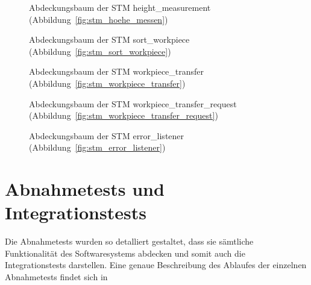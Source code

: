 \begin{figure}
    \caption{Abdeckungsbaum der STM height\_measurement
        (Abbildung~\ref{fig:stm_hoehe_messen})}
    \label{fig:tt_height_measurement}
\end{figure}

\begin{figure}
    \caption{Abdeckungsbaum der STM sort\_workpiece
        (Abbildung~\ref{fig:stm_sort_workpiece})}
    \label{fig:tt_sort_workpiece}
\end{figure}

\begin{figure}
    \caption{Abdeckungsbaum der STM workpiece\_transfer
        (Abbildung~\ref{fig:stm_workpiece_transfer})}
    \label{fig:tt_workpiece_transfer}
\end{figure}

\begin{figure}
    \caption{Abdeckungsbaum der STM workpiece\_transfer\_request
        (Abbildung~\ref{fig:stm_workpiece_transfer_request})}
    \label{fig:tt_workpiece_transfer_request}
\end{figure}

\begin{figure}
    \caption{Abdeckungsbaum der STM error\_listener
        (Abbildung~\ref{fig:stm_error_listener})}
    \label{fig:tt_error_listener}
\end{figure}


\FloatBarrier
\section{Abnahmetests und Integrationstests}\label{sec:abnahmetest}

%
Die Abnahmetests wurden so detalliert gestaltet, dass sie sämtliche Funktionalität
des Softwaresystems abdecken und somit auch die Integrationstests darstellen.
Eine genaue Beschreibung des Ablaufes der einzelnen Abnahmetests findet sich in


